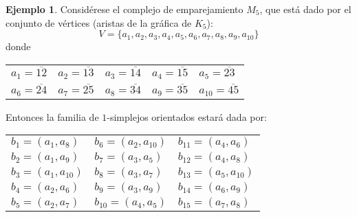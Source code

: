 \documentclass[12pt]{book}
\theoremstyle{definition}
\newtheorem{example}[theorem]{Ejemplo}
\newcounter{in}
\begin{document}
\begin{example}
  \label{ejemploM5}
  Considérese el complejo de emparejamiento $M_{5}$, que
  está dado por el conjunto de vértices (aristas de la gráfica de $K_{5}$):
  $$V=\{a_{1},a_{2},a_{3},a_{4},a_{5},a_{6},a_{7},a_{8},a_{9},a_{10}\}$$
  donde
  \begin{table}[!hbtp]
    \centering
    \begin{tabular}{lllll}
    $a_{1}=\overline{12}$ & $a_{2}=\overline{13}$ & $a_{3}=\overline{14}$ & $a_{4}=\overline{15}$ & $a_{5}=\overline{23}$ \\
    $a_{6}=\overline{24}$ & $a_{7}=\overline{25}$ & $a_{8}=\overline{34}$ & $a_{9}=\overline{35}$ & $a_{10}=\overline{45}$
  \end{tabular}
\end{table}

Entonces la familia de $1$-simplejos orientados estará dada por:
\begin{center}
  \begin{tabular}[h]{lll}
    $b_{1}=(a_{1},a_{8})$ & $b_{6}=(a_{2},a_{10})$ & $b_{11}=(a_{4},a_{6})$  \\
    $b_{2}=(a_{1},a_{9})$ & $b_{7}=(a_{3},a_{5})$ & $b_{12}=(a_{4},a_{8})$  \\
    $b_{3}=(a_{1},a_{10})$ & $b_{8}=(a_{3},a_{7})$ & $b_{13}=(a_{5},a_{10})$  \\
    $b_{4}=(a_{2},a_{6})$ & $b_{9}=(a_{3},a_{9})$ & $b_{14}=(a_{6},a_{9})$  \\
    $b_{5}=(a_{2},a_{7})$ & $b_{10}=(a_{4},a_{5})$ & $b_{15}=(a_{7},a_{8})$  
  \end{tabular}
\end{center}
\begin{figure}[!hbtp]
  \centering
  

\end{figure}
\end{example}
\end{document}
